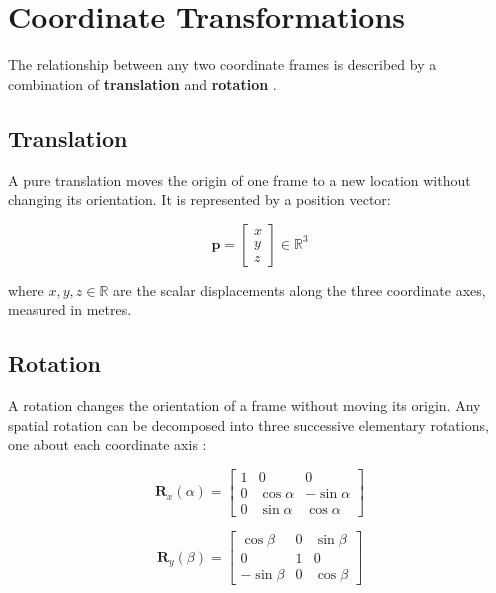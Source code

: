 \section{Coordinate Transformations}
\label{sec:coord_transf}

The relationship between any two coordinate frames is described by a
combination of \textbf{translation} and \textbf{rotation}
\cite{Denavit1955, Craig2005}.

\subsection{Translation}

A pure translation moves the origin of one frame to a new location
without changing its orientation.
It is represented by a position vector:

\begin{equation}
\label{eq:trans}
\mathbf{p} =
\begin{bmatrix} x \\ y \\ z \end{bmatrix}
\in \mathbb{R}^3
\end{equation}

where $x,y,z\in\mathbb{R}$ are the scalar displacements along the
three coordinate axes, measured in metres.

\subsection{Rotation}
\label{subsec:rotation}

A rotation changes the orientation of a frame without moving its
origin.
Any spatial rotation can be decomposed into three successive elementary
rotations, one about each coordinate axis
\cite{Siciliano2009, Craig2005}:

\begin{equation}
\label{eq:Rx}
\mathbf{R}_x(\alpha) =
\begin{bmatrix}
1 & 0          & 0           \\
0 & \cos\alpha & -\sin\alpha \\
0 & \sin\alpha &  \cos\alpha
\end{bmatrix}
\end{equation}

\begin{equation}
\label{eq:Ry}
\mathbf{R}_y(\beta) =
\begin{bmatrix}
 \cos\beta & 0 & \sin\beta \\
 0         & 1 & 0         \\
-\sin\beta & 0 & \cos\beta
\end{bmatrix}
\end{equation}

